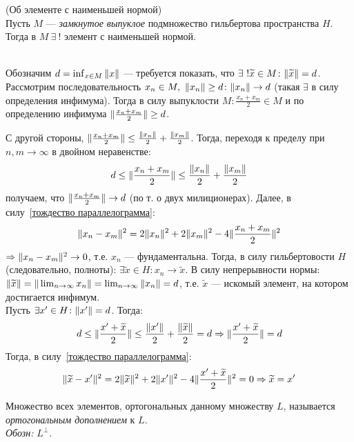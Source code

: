 \begin{theorem}
\label{теорема об элементе с наименьшей нормой}
(Об элементе с наименьшей нормой)
~\\
Пусть $M$ --- \emph{замкнутое выпуклое} подмножество гильбертова пространства $H$. Тогда в $M~\exists~!$ элемент с наименьшей нормой. 
\end{theorem}
\begin{proofocre}
~\\
\boxed{\exists} Обозначим $d = \inf_{x\in M}\|x\|$ --- требуется показать, что $\exists~!\widetilde{x}\in M\colon\|\widetilde{x}\|=d$. Рассмотрим последовательность $x_n\in M,~\|x_n\|\ge d\colon\|x_n\| \to d$ (такая $\exists$ в силу определения инфимума). Тогда в силу выпуклости $M\colon\frac{x_n + x_m}{2}\in M$ и по определению инфимума $\|\frac{x_n + x_m}{2}\|\ge d$.

С другой стороны, $\|\frac{x_n + x_m}{2}\|\le\frac{\|x_n\|}{2} + \frac{\|x_m\|}{2}$. Тогда, переходя к пределу при $n,m\to\infty$ в двойном неравенстве:
$$d\le\|\frac{x_n + x_m}{2}\|\le\frac{\|x_n\|}{2} + \frac{\|x_m\|}{2}$$
получаем, что $\|\frac{x_n + x_m}{2}\|\to d$ (по т. о двух милиционерах). Далее, в силу~\ref{тождество параллелограмма}:
$$ \|x_n - x_m\|^2 = 2\|x_n\|^2 + 2\|x_m\|^2 - 4\|\frac{x_n + x_m}{2}\|^2 $$
$\Rightarrow \|x_n - x_m\|^2 \to 0$, т.е. $x_n$ --- фундаментальна. Тогда, в силу гильбертовости $H$ (следовательно, полноты):
$\exists\widetilde{x}\in H\colon x_n\to \widetilde{x}$. В силу непрерывности нормы:
$\|\widetilde{x}\|=\|\lim_{n\to\infty}x_n\|=\lim_{n\to\infty}\|x_n\|=d$, т.е. $\widetilde{x}$ --- искомый элемент, на котором достигается инфимум.
~\\
\boxed{!} Пусть $\exists x'\in H\colon \|x'\| = d$. Тогда:
$$d\le\|\frac{x' + \widetilde{x}}{2}\|\le\frac{\|x'\|}{2} + \frac{\|\widetilde{x}\|}{2} = d \Rightarrow \|\frac{x' + \widetilde{x}}{2}\| = d$$
Тогда, в силу~\ref{тождество параллелограмма}:
$$\|\widetilde{x} - x'\|^2 = 2\|\widetilde{x}\|^2 + 2\|x'\|^2-4\|\frac{x' + \widetilde{x}}{2}\|^2=0 \Rightarrow \widetilde{x} = x'$$
\end{proofocre}

\begin{definition}
Множество всех элементов, ортогональных данному множеству $L$, называется \emph{ортогональным дополнением} к $L$.\\
\emph{Обозн:} $L^{\perp}$.
\end{definition}

